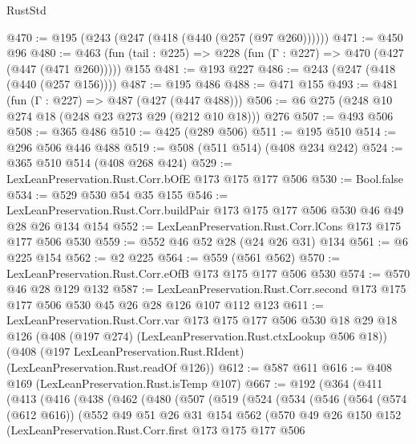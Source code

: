 \begin{lexlean}{RustStd}
\begin{coremodule}
@470 := @195 (@243 (@247 (@418 (@440 (@257 (@97 @260))))))
@471 := @450 @96
@480 := @463 (fun (tail : @225) => @228 (fun (Γ : @227) => @470 (@427 (@447 (@471 @260))))) @155
@481 := @193 @227
@486 := @243 (@247 (@418 (@440 (@257 @156))))
@487 := @195 @486
@488 := @471 @155
@493 := @481 (fun (Γ : @227) => @487 (@427 (@447 @488)))
@506 := @6 @275 (@248 @10 @274 @18 (@248 @23 @273 @29 (@212 @10 @18))) @276
@507 := @493 @506
@508 := @365 @486
@510 := @425 (@289 @506)
@511 := @195 @510
@514 := @296 @506 @446 @488
@519 := @508 (@511 @514) (@408 @234 @242)
@524 := @365 @510 @514 (@408 @268 @424)
@529 := LexLeanPreservation.Rust.Corr.bOfE @173 @175 @177 @506
@530 := Bool.false
@534 := @529 @530 @54 @35 @155
@546 := LexLeanPreservation.Rust.Corr.buildPair @173 @175 @177 @506 @530 @46 @49 @28 @26 @134 @154
@552 := LexLeanPreservation.Rust.Corr.lCons @173 @175 @177 @506 @530
@559 := @552 @46 @52 @28 (@24 @26 @31) @134
@561 := @6 @225 @154
@562 := @2 @225
@564 := @559 (@561 @562)
@570 := LexLeanPreservation.Rust.Corr.eOfB @173 @175 @177 @506 @530
@574 := @570 @46 @28 @129 @132
@587 := LexLeanPreservation.Rust.Corr.second
    @173
    @175
    @177
    @506
    @530
    @45
    @26
    @28
    @126
    @107
    @112
    @123
@611 := LexLeanPreservation.Rust.Corr.var
    @173
    @175
    @177
    @506
    @530
    @18
    @29
    @18
    @126
    (@408 (@197 @274) (LexLeanPreservation.Rust.ctxLookup @506 @18))
    (@408 (@197 LexLeanPreservation.Rust.RIdent) (LexLeanPreservation.Rust.readOf @126))
@612 := @587 @611
@616 := @408 @169 (LexLeanPreservation.Rust.isTemp @107)
@667 := @192
    (@364
      (@411
        (@413
          (@416
            (@438
              (@462
                (@480
                  (@507
                    (@519
                      (@524
                        (@534
                          (@546
                            (@564
                              (@574 (@612 @616))
                              (@552
                                @49
                                @51
                                @26
                                @31
                                @154
                                @562
                                (@570
                                  @49
                                  @26
                                  @150
                                  @152
                                  (LexLeanPreservation.Rust.Corr.first
                                    @173
                                    @175
                                    @177
                                    @506

\end{coremodule}
\end{lexlean}
